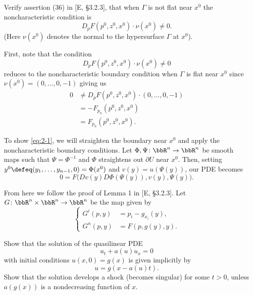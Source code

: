 \begin{problem}
  Verify assertion (36) in [E, \S 3.2.3], that when \(\Gamma\) is not flat
  near \(x^0\) the noncharacteristic condition is
  \[
    D_pF(p^0,z^0,x^0)\cdot \nu(x^0)\neq 0.
  \]
  (Here \(\nu(x^0)\) denotes the normal to the hypersurface \(\Gamma\) at
  \(x^0\)).
\end{problem}
\begin{solution}
  First, note that the condition
  \begin{equation}
    \label{eq:2-1}
    D_pF(p^0,z^0,x^0)\cdot \nu(x^0)\neq 0
  \end{equation}
  reduces to the noncharacteristic boundary condition when \(\Gamma\) is
  flat near \(x^0\) since \(\nu(x^0)=(0,\dotsc,0,-1)\) giving us
  \begin{align*}
    0&\neq D_pF(p^0,z^0,x^0)\cdot (0,\dotsc,0,-1)\\
     &=-F_{p_n}(p^0,z^0,x^0)\\
     &=F_{p_n}(p^0,z^0,x^0).
  \end{align*}

  To show \eqref{eq:2-1}, we will straighten the boundary near \(x^0\) and
  apply the noncharacteristic boundary conditions. Let
  \(\Phi,\Psi\colon\bbR^n\to\bbR^n\) be smooth maps such that
  \(\Psi=\Phi^{-1}\) and \(\Phi\) straightens out \(\partial U\) near
  \(x^0\). Then, setting \(y^0\defeq (y_1,\dotsc,y_{n-1},0)=\Phi(x^0)\) and
  \(v(y)=u(\Psi(y))\), our PDE becomes
  \[
    0=F\bigl(Dv(y)D\Phi(\Psi(y)),v(y),\Psi(y)\bigr).
  \]


  From here we follow the proof of Lemma 1 in [E, \S 3.2.3]. Let
  \(G\colon\bbR^n\times\bbR^n\to\bbR^n\) be the map given by
  \[
    \left\{
      \begin{aligned}
        G^i(p,y)&=p_i-g_{x_i}(y),\\
        G^n(p,y)&=F(p,g(y),y).
      \end{aligned}
    \right.
  \]
\end{solution}
\newpage

\begin{problem}
  Show that the solution of the quasilinear PDE
  \[
    u_t+a(u)u_x=0
  \]
  with initial conditions \(u(x,0)=g(x)\) is given implicitly by
  \[
    u=g(x-a(u)t).
  \]
  Show that the solution develops a shock (becomes singular) for some
  \(t>0\), unless \(a(g(x))\) is a nondecreasing function of
  \(x\).
\end{problem}
\begin{solution}

\end{solution}
\newpage

